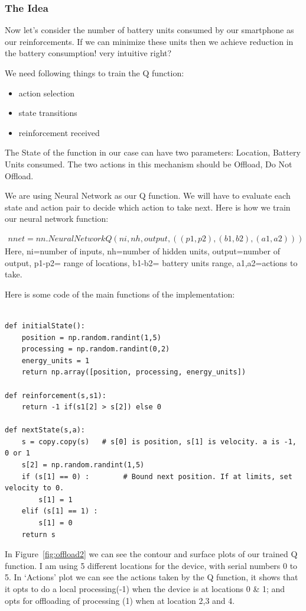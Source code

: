 \documentclass{article}
\begin{document}
\subsubsection{The Idea}
Now let's consider the number of battery units consumed by our smartphone as our reinforcements. If we can minimize these units then we achieve reduction in the battery consumption! very intuitive right? \par
We need following things to train the Q function:
\begin{itemize}
   \item action selection
   \item state transitions
   \item reinforcement received
\end{itemize}
The State of the function in our case can have two parameters: Location, Battery Units consumed. The two actions in this mechanism should be Offload, Do Not Offload.\par
We are using Neural Network as our Q function. We will have to evaluate each state and action pair to decide which action to take next. Here is how we train our neural network function:\par
\begin{align*}
nnet = nn.NeuralNetworkQ(ni,nh,output,((p1,p2), (b1,b2), (a1,a2)))
\end{align*}
Here, ni=number of inputs, nh=number of hidden units, output=number of output, p1-p2= range of locations, b1-b2= battery units range, a1,a2=actions to take. \par
Here is some code of the main functions of the implementation:
\begin{small}
\begin{lstlisting}

def initialState():
    position = np.random.randint(1,5)
    processing = np.random.randint(0,2)
    energy_units = 1
    return np.array([position, processing, energy_units])

def reinforcement(s,s1):
    return -1 if(s1[2] > s[2]) else 0

def nextState(s,a):
    s = copy.copy(s)   # s[0] is position, s[1] is velocity. a is -1, 0 or 1
    s[2] = np.random.randint(1,5)
    if (s[1] == 0) :        # Bound next position. If at limits, set velocity to 0.
        s[1] = 1
    elif (s[1] == 1) :
        s[1] = 0
    return s
\end{lstlisting}
\end{small}
In Figure~\ref{fig:offload2} we can see the contour and surface plots of our trained Q function. I am using 5 different locations for the device, with serial numbers 0 to 5. In `Actions' plot we can see the actions taken by the Q function, it shows that it opts to do a local processing(-1) when the device is at locations 0 \& 1; and opts for offloading of processing (1) when at location 2,3 and 4.  
\end{document}
